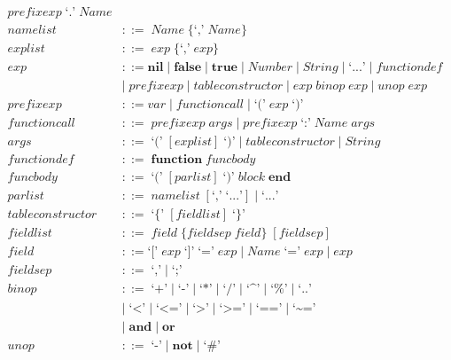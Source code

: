 \begin{align*}
  \textit{prefixexp} \; \texttt{`.'} \; \textit{Name}\\
\textit{namelist} & ::= \; \textit{Name} \; \{\texttt{`,'} \; \textit{Name}\}\\
\textit{explist} & ::= \; \textit{exp} \; \{\texttt{`,'} \; \textit{exp}\}\\
\textit{exp} & ::= \textbf{nil} \; | \;
  \textbf{false} \; | \;
  \textbf{true} \; | \;
  \textit{Number} \; | \;
  \textit{String} \; | \;
  \texttt{`...'} \; | \;
  \textit{functiondef}\\
& | \; \textit{prefixexp} \; | \;
  \textit{tableconstructor} \; | \;
  \textit{exp} \; \textit{binop} \; \textit{exp} \; | \;
  \textit{unop} \; \textit{exp}\\
\textit{prefixexp} & ::= \textit{var} \; | \;
  \textit{functioncall} \; | \;
  \texttt{`('} \; \textit{exp} \; \texttt{`)'}\\
\textit{functioncall} & ::= \; \textit{prefixexp} \; \textit{args} \; | \;
  \textit{prefixexp} \; \texttt{`:'} \; \textit{Name} \; \textit{args}\\
\textit{args} & ::= \; \texttt{`('} \; [\textit{explist}] \; \texttt{`)'} \; | \;
  \textit{tableconstructor} \; | \;
  \textit{String}\\
\textit{functiondef} & ::= \; \textbf{function} \; \textit{funcbody}\\
\textit{funcbody} & ::= \; \texttt{`('} \; [\textit{parlist}] \; \texttt{`)'} \; \textit{block} \; \textbf{end}\\
\textit{parlist} & ::= \; \textit{namelist} \; [\texttt{`,'} \; \texttt{`...'}] \; | \; \texttt{`...'}\\
\textit{tableconstructor} & ::= \; \texttt{`\{'} \; [\textit{fieldlist}] \; \texttt{`\}'}\\
\textit{fieldlist} & ::= \; \textit{field} \; \{\textit{fieldsep} \; \textit{field}\} \; [\textit{fieldsep}]\\
\textit{field} & ::= \texttt{`['} \; \textit{exp} \; \texttt{`]'} \; \texttt{`='} \; \textit{exp} \; | \;
  \textit{Name} \; \texttt{`='} \; \textit{exp} \; | \;
  \textit{exp}\\
\textit{fieldsep} & ::= \; \texttt{`,'} \; | \; \texttt{`;'}\\
\textit{binop} & ::= \; \texttt{`+'} \; | \; \texttt{`-'} \; | \; \texttt{`*'} \; | \; \texttt{`/'} \; | \;
  \texttt{`\textasciicircum'} \; | \; \texttt{`\%'} \; | \; \texttt{`..'}\\
& | \; \texttt{`<'} \; | \; \texttt{`<='} \; | \; \texttt{`>'} \; | \; \texttt{`>='} \; | \;
  \texttt{`=='} \; | \; \texttt{`\textasciitilde='}\\
& | \; \textbf{and} \; | \; \textbf{or}\\
\textit{unop} & ::= \; \texttt{`-'} \; | \; \textbf{not} \; | \; \texttt{`\#'}
\end{align*}
